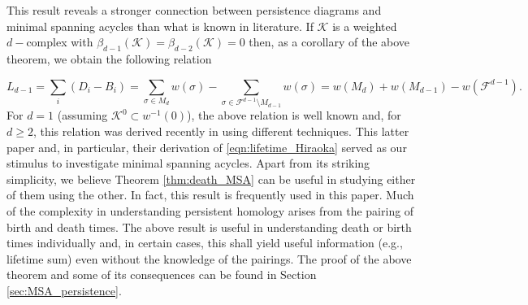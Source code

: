 \documentclass[12pt]{amsart}
\newcommand{\gt}[1]{\textcolor{blue}{#1}}
\renewcommand{\gt}[1]{#1}
\numberwithin{equation}{section}
\numberwithin{theorem}{section}
\newcommand{\md}{\mathrm{d}}
\newcommand{\1}{\mathbf{1}}
\def\F{\mathcal{F}}
\def\K{\mathcal{K}}
\begin{document}
%
\gt{This result reveals a stronger connection between persistence diagrams and minimal spanning acycles than what is known in literature}. If $\K$ is a weighted $d-$complex with $\beta_{d-1}(\K) = \beta_{d-2}(\K) = 0$ then, as a corollary of the above theorem, we obtain the following relation
%
\gt{
\begin{equation}
\label{eqn:lifetime_Hiraoka}
L_{d-1} = \sum_i(D_i - B_i) =  %
\sum_{\sigma \in M_d}w(\sigma)   -  \sum_{\sigma \in \F^{d-1} \setminus M_{d-1}}w(\sigma) = w(M_d) + w(M_{d-1}) - w(\F^{d-1}).
\end{equation}}
%
For $d = 1$ (assuming $\K^0 \subset w^{-1}(0)$), the above relation is well known and, for $d \geq 2$, this relation was derived recently in \cite[Theorem 1.1]{hiraoka2015minimum} using different techniques. This latter paper and, in particular, their derivation of \eqref{eqn:lifetime_Hiraoka} served as our stimulus to investigate minimal spanning acycles. Apart from its striking simplicity, 
we believe Theorem \ref{thm:death_MSA} can be useful in studying either of them using the other. In fact, this result is frequently used in this paper. Much of the complexity in understanding persistent homology arises from the pairing of birth and death times. The above result is useful in understanding death or birth times individually and, in certain cases, this shall yield useful information (e.g., lifetime sum) even without the knowledge of the pairings.
The proof of the above theorem and some of its consequences can be found in Section \ref{sec:MSA_persistence}. 
\end{document}
